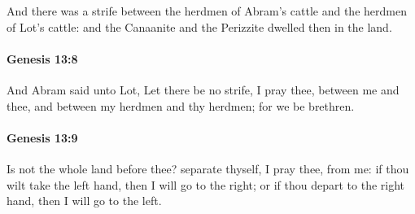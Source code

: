 			And there was a strife between the herdmen of Abram's cattle and the herdmen of Lot's cattle: and the Canaanite and the Perizzite dwelled then in the land.


		\paragraph{Genesis 13:8} %
			\label{GENESIS-13-8}

			And Abram said unto Lot, Let there be no strife, I pray thee, between me and thee, and between my herdmen and thy herdmen; for we be brethren.


		\paragraph{Genesis 13:9} %
			\label{GENESIS-13-9}

			Is not the whole land before thee?  separate thyself, I pray thee, from me: if thou wilt take the left hand, then I will go to the right; or if thou depart to the right hand, then I will go to the left.


